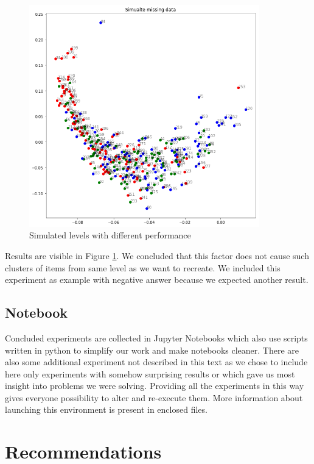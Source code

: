 \documentclass[
  digital, %
  table,   %
  nolof,     %
  nolot,     %
  nocover,
  color
]{fithesis3}
\begin{document}
\begin{figure}
  \includegraphics[width=10cm]{img/simulated_performance}
  \caption{Simulated levels with different performance}
  \label{fig:simulated_performance}
\end{figure}


Results are visible in Figure \ref{fig:simulated_performance}. We concluded that this factor does not cause such clusters of items from same level as we want to recreate. We included this experiment as example with negative answer because we expected another result.


\section{Notebook}\label{notebook}

Concluded experiments are collected in Jupyter Notebooks which also use scripts written in python to simplify our work and make notebooks cleaner. There are also some additional experiment not described in this text as we chose to include here only experiments with somehow surprising results or which gave us most insight into problems we were solving. Providing all the experiments in this way gives everyone possibility to alter and re-execute them. More information about launching this environment is present in enclosed files.

\chapter{Recommendations}\label{recommendations}
\end{document}
